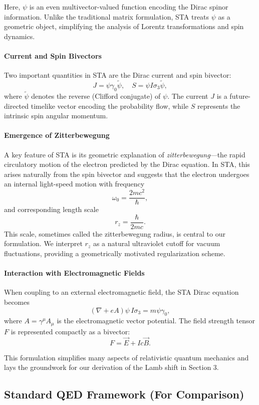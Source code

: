 \documentclass[12pt]{article}
\begin{document}
Here, \(\psi\) is an even multivector-valued function encoding the Dirac spinor information. Unlike the traditional matrix formulation, STA treats \(\psi\) as a geometric object, simplifying the analysis of Lorentz transformations and spin dynamics.

\paragraph{Current and Spin Bivectors}
Two important quantities in STA are the Dirac current and spin bivector:
\[
J = \psi\gamma_0\widetilde{\psi}, \quad S = \psi I\sigma_3\widetilde{\psi},
\]
where \(\widetilde{\psi}\) denotes the reverse (Clifford conjugate) of \(\psi\). The current \(J\) is a future-directed timelike vector encoding the probability flow, while \(S\) represents the intrinsic spin angular momentum.

\paragraph{Emergence of Zitterbewegung}
A key feature of STA is its geometric explanation of \emph{zitterbewegung}—the rapid circulatory motion of the electron predicted by the Dirac equation. In STA, this arises naturally from the spin bivector and suggests that the electron undergoes an internal light-speed motion with frequency
\[
\omega_0 = \frac{2mc^2}{\hbar},
\]
and corresponding length scale
\[
r_z = \frac{\hbar}{2mc}.
\]
This scale, sometimes called the zitterbewegung radius, is central to our formulation. We interpret \(r_z\) as a natural ultraviolet cutoff for vacuum fluctuations, providing a geometrically motivated regularization scheme.

\paragraph{Interaction with Electromagnetic Fields}
When coupling to an external electromagnetic field, the STA Dirac equation becomes
\[
(\nabla + eA)\psi\,I\sigma_3 = m\psi\gamma_0,
\]
where \(A = \gamma^\mu A_\mu\) is the electromagnetic vector potential. The field strength tensor \(F\) is represented compactly as a bivector:
\[
F = \vec{E} + I c \vec{B}.
\]

This formulation simplifies many aspects of relativistic quantum mechanics and lays the groundwork for our derivation of the Lamb shift in Section 3.


\subsection{Standard QED Framework (For Comparison)}\label{subsec:standard_qed}
\end{document}
